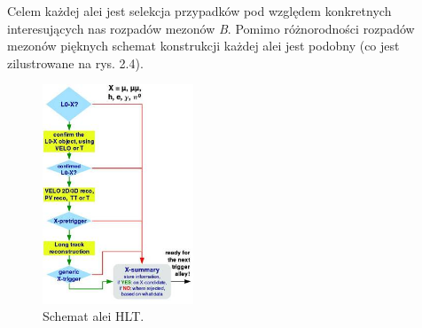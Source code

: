 \documentclass{pracamgr}
\begin{document}
\noindent
Celem każdej alei jest selekcja przypadków pod względem konkretnych interesujących nas rozpadów mezonów \textit{B}. Pomimo różnorodności rozpadów mezonów pięknych schemat konstrukcji każdej alei jest podobny (co jest zilustrowane na rys. 2.4).\\

\begin{figure}[!h]
 \centering
 \includegraphics[width=0.4\textwidth]{rysunki/introduction/aleja.jpg}
 \caption{Schemat alei HLT.}
\end{figure}
\end{document}
